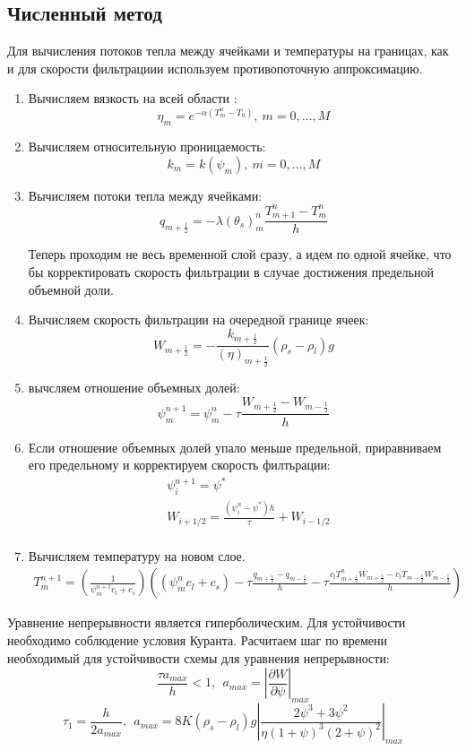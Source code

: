 \documentclass[12pt,a4paper]{article}
\newcommand{\pd}[2]{\frac{\partial #1}{\partial #2}}
\begin{document}
\subsection{Численный метод}
Для вычисления потоков тепла между ячейками и температуры на границах, как и для скорости фильтрациии используем противопоточную аппроксимацию.
\begin{enumerate}
\item Вычисляем вязкость на всей области : 
$$
\eta_m = e^{-\alpha(T_m^n - T_{0})},\ m = 0, \dots ,M
$$
\item Вычисляем относительную проницаемость:
$$
k_m = k(\psi_m) , \ m = 0,  \dots ,M
$$
\item Вычисляем потоки тепла между ячейками:
$$
q_{m+\frac12} = - \lambda (\theta_{s})_m^{n} \frac{T_{m+1}^n - T_m^n}{h} 
$$

Теперь проходим не весь временной слой сразу, а идем по одной ячейке, что бы корректировать скорость фильтрации в случае достижения предельной объемной доли.
\item Вычисляем скорость фильтрации на очередной границе ячеек:
$$
W_{m+\frac12} = -\frac{k_{m+\frac12}}{(\eta)_{m+\frac12}}(\rho_s - \rho_l)g
$$
\item  вычсляем отношение объемных долей:
$$
\psi_m^{n+1} = \psi_m^n - \tau \frac{W_{m+\frac12} - W_{m-\frac12}}{h}
$$
\item Если отношение объемных долей упало меньше предельной, приравниваем его предельному и корректируем скорость филтьрации:
$$
\begin{aligned}
&\psi_{i}^{n+1} = \psi^* \\
&W_{i+1/2} = \frac{(\psi_i^n - \psi^*)h}{\tau} + W_{i-1/2} \\
\end{aligned}
$$
\item Вычисляем температуру на новом слое. 
\begin{multline}
 T_m^{n+1} =  \left(\frac{1}{\psi_m^{n+1} c_l + c_s}\right)\left( (\psi_m^n  c_l + c_s)
- \tau\frac{q_{m+\frac12} - q_{m-\frac12}}{h} - \tau\frac{c_l T_{m+\frac12}^n W_{m+\frac12} - c_l T_{m-\frac12} W_{m-\frac12}}{h}\right)
\end{multline}
\end{enumerate}

Уравнение непрерывности является гиперболическим. Для устойчивости необходимо соблюдение условия Куранта. Расчитаем шаг по времени необходимый для устойчивости схемы для уравнения непрерывности:
$$
\frac{\tau a_{max}}{h} < 1,\ \ a_{max} = \left|\pd{W}{\psi}\right|_{max}
$$
$$
\tau_1 = \frac{h}{2 a_{max}},\ \  a_{max} = 8 K (\rho_s - \rho_l)g\left|\frac{2\psi^3 + 3\psi^2}{\eta(1 + \psi)^3(2+\psi)^2}\right|_{max}
$$
\end{document}
